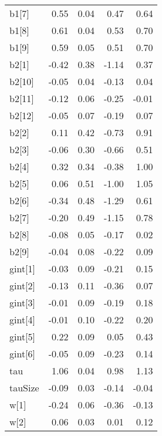 \documentclass[12pt,]{article}
\begin{document}
\begin{table}[ht]
{\begin{tabular}{lrrrr}
  b1[7] & 0.55 & 0.04 & 0.47 & 0.64 \\ 
  b1[8] & 0.61 & 0.04 & 0.53 & 0.70 \\ 
  b1[9] & 0.59 & 0.05 & 0.51 & 0.70 \\ 
  b2[1] & -0.42 & 0.38 & -1.14 & 0.37 \\ 
  b2[10] & -0.05 & 0.04 & -0.13 & 0.04 \\ 
  b2[11] & -0.12 & 0.06 & -0.25 & -0.01 \\ 
  b2[12] & -0.05 & 0.07 & -0.19 & 0.07 \\ 
  b2[2] & 0.11 & 0.42 & -0.73 & 0.91 \\ 
  b2[3] & -0.06 & 0.30 & -0.66 & 0.51 \\ 
  b2[4] & 0.32 & 0.34 & -0.38 & 1.00 \\ 
  b2[5] & 0.06 & 0.51 & -1.00 & 1.05 \\ 
  b2[6] & -0.34 & 0.48 & -1.29 & 0.61 \\ 
  b2[7] & -0.20 & 0.49 & -1.15 & 0.78 \\ 
  b2[8] & -0.08 & 0.05 & -0.17 & 0.02 \\ 
  b2[9] & -0.04 & 0.08 & -0.22 & 0.09 \\ 
  gint[1] & -0.03 & 0.09 & -0.21 & 0.15 \\ 
  gint[2] & -0.13 & 0.11 & -0.36 & 0.07 \\ 
  gint[3] & -0.01 & 0.09 & -0.19 & 0.18 \\ 
  gint[4] & -0.01 & 0.10 & -0.22 & 0.20 \\ 
  gint[5] & 0.22 & 0.09 & 0.05 & 0.43 \\ 
  gint[6] & -0.05 & 0.09 & -0.23 & 0.14 \\ 
  tau & 1.06 & 0.04 & 0.98 & 1.13 \\ 
  tauSize & -0.09 & 0.03 & -0.14 & -0.04 \\ 
  w[1] & -0.24 & 0.06 & -0.36 & -0.13 \\ 
  w[2] & 0.06 & 0.03 & 0.01 & 0.12 \\ 
   \hline
\end{tabular}
}
\end{table}
\end{document}
